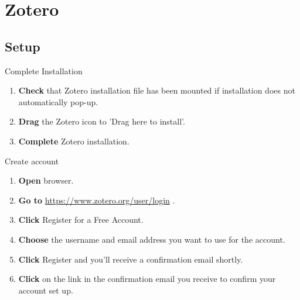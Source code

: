 \documentclass[10pt,a4paper]{article}
\begin{document}


\section{Zotero}
\subsection{Setup}
\begin{textbox}{Complete Installation}
 

  

\begin{enumerate}
\item \textbf{Check} that Zotero installation file has been mounted if installation does not automatically pop-up.
\item \textbf{Drag} the Zotero icon to 'Drag here to install'.
\item \textbf{Complete} Zotero installation.
\end{enumerate}

\end{textbox}

\begin{textbox}{Create account}
 

  

\begin{enumerate}
\item \textbf{Open} browser.
\item \textbf{Go to}  \href{https://www.zotero.org/user/login}{https://www.zotero.org/user/login} .
\item \textbf{Click} Register for a Free Account.
\item \textbf{Choose} the username and email address you want to use for the account.
\item \textbf{Click} Register and you’ll receive a confirmation email shortly.
\item \textbf{Click} on the link in the confirmation email you receive to confirm your account set up.
\end{enumerate}

\end{textbox}
\end{document}

